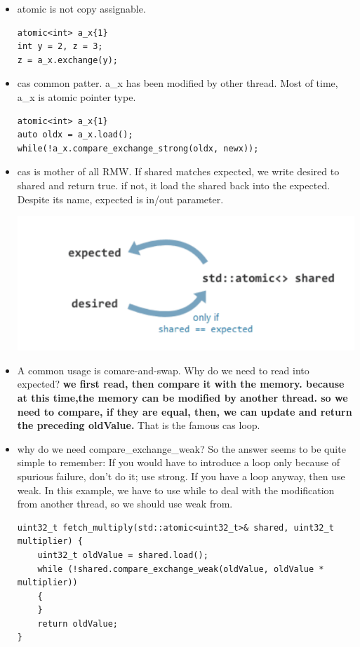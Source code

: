 \documentclass[a4paper,11pt,twoside]{book}
\begin{document}
\begin{itemize}
	\item atomic is not copy assignable.
\begin{lstlisting}[numbers=none]
atomic<int> a_x{1}
int y = 2, z = 3;
z = a_x.exchange(y);
\end{lstlisting}

	\item cas common patter. a\_x has been modified by other thread. Most of time, a\_x is atomic pointer type.
\begin{lstlisting}[numbers=none]
atomic<int> a_x{1}
auto oldx = a_x.load();
while(!a_x.compare_exchange_strong(oldx, newx));
\end{lstlisting}
	
		\item cas is mother of all RMW. If shared matches expected, we write desired to shared and return true. if not, it load the shared back into the expected. Despite its name, expected is in/out parameter. 

\begin{center}
	\includegraphics[width=0.65\linewidth]{pics/cas.png}
\end{center}


		\item A common usage is comare-and-swap. Why do we need to read into expected? \textbf{we first read, then compare it with the memory. because at this time,the memory can be modified by another thread. so we need to compare, if they are equal, then, we can update and return the preceding oldValue.} That is the famous cas loop. 

		\item why do we need compare\_exchange\_weak?  So the answer seems to be quite simple to remember: If you would have to introduce a loop only because of spurious failure, don't do it; use strong. If you have a loop anyway, then use weak. In this example, we have to use while to deal with the modification from another thread, so we should use weak from.


\begin{lstlisting}
uint32_t fetch_multiply(std::atomic<uint32_t>& shared, uint32_t multiplier) {
    uint32_t oldValue = shared.load();
    while (!shared.compare_exchange_weak(oldValue, oldValue * multiplier))
    {
    }
    return oldValue;
}
\end{lstlisting}


\end{itemize}
\end{document}
